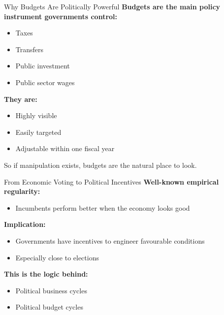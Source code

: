 \documentclass[10pt]{beamer}
\begin{document}
\begin{frame}{Why Budgets Are Politically Powerful}
\textbf{Budgets are the main policy instrument governments control:}

\begin{itemize}
\item Taxes
\item Transfers
\item Public investment
\item Public sector wages
\end{itemize}

\vspace{0.5cm}
\textbf{They are:}
\begin{itemize}
\item Highly visible
\item Easily targeted
\item Adjustable within one fiscal year
\end{itemize}

\vspace{0.5cm}
\alert{So if manipulation exists, budgets are the natural place to look.}
\end{frame}


\begin{frame}{From Economic Voting to Political Incentives}
\textbf{Well-known empirical regularity:}

\begin{itemize}
\item Incumbents perform better when the economy looks good
\end{itemize}

\vspace{0.5cm}
\textbf{Implication:}
\begin{itemize}
\item Governments have incentives to \alert{engineer} favourable conditions
\item Especially close to elections
\end{itemize}

\vspace{0.5cm}
\textbf{This is the logic behind:}
\begin{itemize}
\item Political business cycles
\item Political budget cycles
\end{itemize}
\end{frame}
\end{document}
